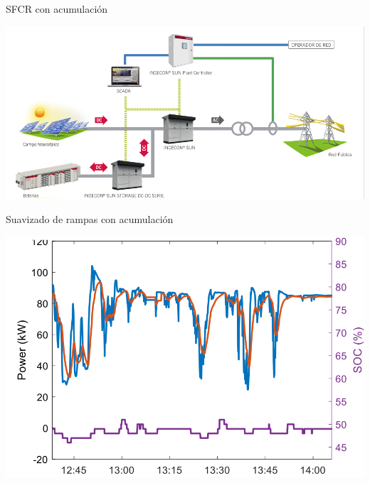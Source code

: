 \documentclass[aspectratio=169, usenames,svgnames,dvipsnames]{beamer}
\begin{document}
\begin{frame}[label={sec:orgf757d33}]{SFCR con acumulación}
\begin{center}
\includegraphics[width=\textwidth]{../figs/EsquemaSFCRAcumulacion.pdf}
\end{center}
\end{frame}

\begin{frame}[label={sec:orgf220257}]{Suavizado de rampas con acumulación}
\begin{center}
\includegraphics[height=0.9\textheight]{../figs/SuavizadoRampasAcumulacion.png}
\end{center}
\end{frame}
\end{document}
